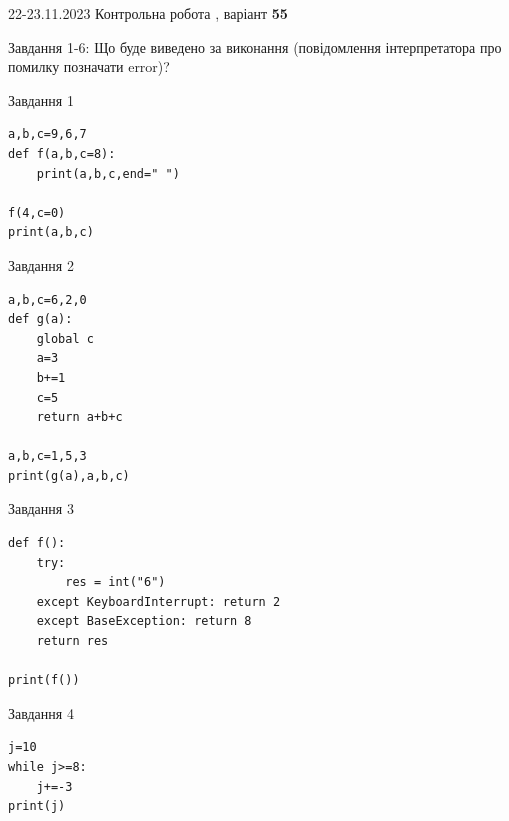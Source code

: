 \documentclass[12pt, ukrainian]{article}
\begin{document}
{{22-23.11.2023 Контрольна робота , варіант  \No \textbf { 55 }\par}}
{

Завдання 1-6: Що буде виведено за виконання (повідомлення інтерпретатора про помилку позначати error)?


\begin{minipage}[t]{9.7cm}                
{\begin{center}Завдання {1}\end{center}}
\begin{verbatim}
a,b,c=9,6,7
def f(a,b,c=8):
    print(a,b,c,end=" ")

f(4,c=0)
print(a,b,c)
\end{verbatim}     
\end{minipage}
\vline \hspace{8mm}
\begin{minipage}[t]{8.0cm}                
{\begin{center}Завдання {2}\end{center}}
\begin{verbatim}
a,b,c=6,2,0
def g(a):
    global c
    a=3
    b+=1
    c=5
    return a+b+c

a,b,c=1,5,3
print(g(a),a,b,c)
\end{verbatim}     
\end{minipage}

\vspace{15mm}
\begin{minipage}[t]{9.7cm}                
{\begin{center}Завдання {3}\end{center}}
\begin{verbatim}
def f():
    try:
        res = int("6")
    except KeyboardInterrupt: return 2
    except BaseException: return 8
    return res

print(f())
\end{verbatim}     
\end{minipage}
\vline \hspace{8mm}
\begin{minipage}[t]{8.0cm}                
{\begin{center}Завдання {4}\end{center}}
\begin{verbatim}
j=10
while j>=8:
    j+=-3
print(j)
\end{verbatim}     
\end{minipage}

}
\end{document}
